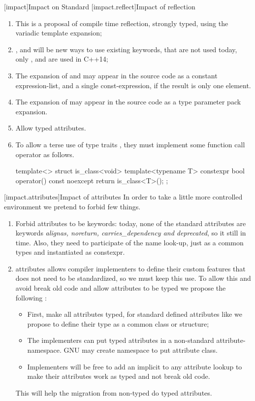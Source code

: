 [impact]{Impact on Standard}
[impact.reflect]{Impact of reflection}
\begin{enumerate}
\item This is a proposal of compile time reflection, strongly typed, using the variadic template expansion;
\item {},  and  will be new ways to use existing keywords, that are not used today, only ,  and  are used in C++14;
\item The expansion of  and  may appear in the source code as a constant expression-list, and a single const-expression, if the result is only one element.
\item The expansion of  may appear in the source code as a type parameter pack expansion.
\item Allow typed attributes.
\item To allow a terse use of type traits , they must implement some function call operator as follows.
\begin{codeblock}
template<>
struct is_class<void> {
 template<typename T>
 constexpr bool operator() const noexcept {
   return is_class<T>();
 }
};
\end{codeblock}
\end{enumerate}

[impact.attributes]{Impact of attributes}
In order to take a little more controlled environment we pretend to forbid few things.
\begin{enumerate}
\item Forbid attributes to be keywords: today, none of the standard attributes are keywords \emph{alignas, noreturn, carries\_dependency and deprecated}, so it still in time. Also, they need to participate of the name look-up, just as a common types and instantiated as constexpr.
\item \Cpp attributes allows compiler implementers to define their custom features that does not need to be standardized, so we must keep this use. To allow this and avoid break old code and allow attributes to be typed we propose the following :
\begin{itemize}
\item First, make all attributes typed, for standard defined attributes like \tcode{[[deprecated]]} we propose to define their type as a common class or structure;
\item The implementers can put typed attributes in a non-standard attribute-namespace. \enterexample GNU may create  namespace to put  attribute class. \exitexample
\item Implementers will be free to add an implicit  to any attribute lookup to make their attributes work as typed and not break old code.
\end{itemize}
This will help the migration from non-typed do typed attributes.
\end{enumerate}

